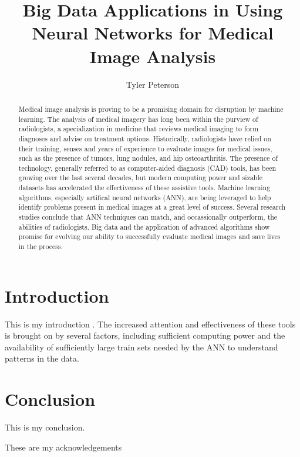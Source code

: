 \documentclass[sigconf]{acmart}
\begin{document}
\title{Big Data Applications in Using Neural Networks for Medical Image Analysis}


\author{Tyler Peterson}


\renewcommand{\shortauthors}{G. v. Laszewski}


\begin{abstract}

 Medical image analysis is proving to be a promising domain for disruption by machine learning. The analysis of medical imagery has long been within the purview of radiologists, a specialization in medicine that reviews medical imaging to form diagnoses and advise on treatment options. Historically, radiologists have relied on their training, senses and years of experience to evaluate images for medical issues, such as the presence of tumors, lung nodules, and hip osteoarthritis. The presence of technology, generally referred to as computer-aided diagnosis (CAD) tools, has been growing over the last several decades, but modern computing power and sizable datasets has accelerated the effectiveness of these assistive tools. Machine learning algorithms, especially artifical neural networks (ANN), are being leveraged to help identify problems present in medical images at a great level of success. Several research studies conclude that ANN techniques can match, and occassionally outperform, the abilities of radiologists. Big data and the application of advanced algorithms show promise for evolving our ability to successfully evaluate medical images and save lives in the process.      
  
\end{abstract}




\maketitle


\section{Introduction}

 This is my introduction \cite{editor00}. The increased attention and effectiveness of these tools is brought on by several factors, including sufficient computing power and the availability of sufficiently large train sets needed by the ANN to understand patterns in the data.


\section{Conclusion}

 This is my conclusion.

 
\begin{acks}

 These are my acknowledgements

\end{acks}



 


\appendix
 


\end{document}
